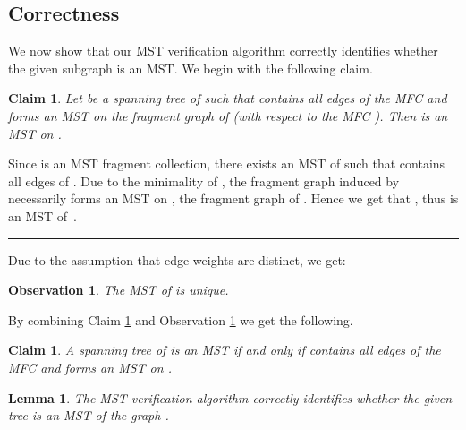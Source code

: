 \documentclass[11pt,letter]{article}
\newtheorem{lemma}[theorem]{Lemma}
\newtheorem{observation}[theorem]{Observation}
\newtheorem{claim}[theorem]{Claim}
\newcommand{\qed}{\rule{7pt}{7pt}}
\newenvironment{proof}{\noindent{\bf Proof}\hspace*{1em}}{\qed\bigskip}
\begin{document}
\subsection{Correctness}

We now show that our MST verification algorithm correctly identifies whether 
the given subgraph  is an MST. We begin with the following claim.

\begin{claim} \label{clm_fragmet_mst}
Let  be a spanning tree of  such that  contains all edges of the MFC 
 and  forms an MST on the fragment graph of  (with respect 
to  the MFC ). Then  is an MST on .
\end{claim}
\begin{proof} 
Since  is an MST fragment collection, there exists an MST  of  
such that  contains all edges of . Due to the minimality 
of , the fragment graph  induced by  necessarily forms 
an MST on , the fragment graph of . 
Hence we get that , thus  is an MST of~.
\end{proof}

Due to the assumption that edge weights are distinct, we get:
\begin{observation} 
\label{unique_mst}
The MST of  is unique.
\end{observation}
By combining Claim \ref{clm_fragmet_mst} and Observation \ref{unique_mst} 
we get the following.
\begin{claim} \label{show_mst}
A spanning tree  of  is an MST if and only if   contains all edges 
of the MFC  and  forms an MST on .
\end{claim}

\begin{lemma}
\label{lem:correct}
The MST verification algorithm correctly identifies whether the given tree  
is an MST of the graph .
\end{lemma}
\end{document}
